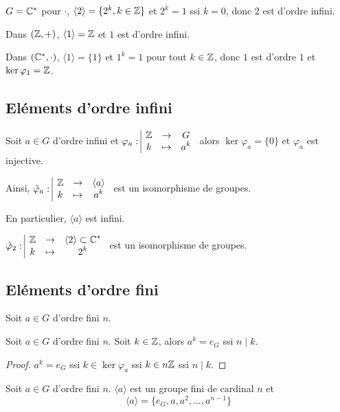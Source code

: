\begin{exemple}
    $G = \mathbb{C}^*$ pour $\cdot$, $\langle 2 \rangle = \{2^k, k \in \mathbb{Z}\}$ et
    $2^k = 1$ ssi $k = 0$, donc $2$ est d'ordre infini.

    Dans $(\mathbb{Z}, +)$, $\langle 1 \rangle = \mathbb{Z}$ et $1$ est d'ordre infini.

    \avspace Dans $(\mathbb{C}^*, \cdot)$, $\langle 1 \rangle = \{1\}$ et
    $1^k = 1$ pour tout $k \in \mathbb{Z}$, donc $1$ est d'ordre $1$ et 
    $\ker \varphi_1 = \mathbb{Z}$.
\end{exemple}


\subsection{Eléments d'ordre infini}

\begin{proposition}{}{}
    Soit $a \in G$ d'ordre infini et $\varphi_a: \space \begin{array}{|ccc} \displaystyle \mathbb{Z} & \to & \displaystyle G \\ \displaystyle k & \mapsto & \displaystyle a^k \end{array}$ 
    alors $\ker \varphi_a = \{0\}$ et $\varphi_a$ est injective.

    Ainsi, $\tilde \varphi_a: \space \begin{array}{|ccc} \displaystyle \mathbb{Z} & \to & \displaystyle \langle a \rangle \\ \displaystyle k & \mapsto & \displaystyle a^k \end{array}$  est un 
    isomorphisme de groupes.

    En particulier, $\langle a \rangle$ est infini.
\end{proposition}

\begin{exemple}
    $\tilde \varphi_2: \space \begin{array}{|ccc} \displaystyle \mathbb{Z} & \to & \displaystyle \langle 2 \rangle \subset \mathbb{C}^* \\ \displaystyle k & \mapsto & \displaystyle 2^k \end{array}$ est un isomorphisme de groupes.

\end{exemple}


\subsection{Eléments d'ordre fini}

Soit $a \in G$ d'ordre fini $n$.

\begin{proposition}{}{}
    Soit $a \in G$ d'ordre fini $n$.
    Soit $k \in \mathbb{Z}$, alors
    $a^k = e_G$ ssi $n \mid k$.
\end{proposition}

\begin{proof}
    $a^k = e_G$ ssi $k \in \ker \varphi_a$ ssi $k \in n \mathbb{Z}$ ssi $n \mid k$.
\end{proof}

\begin{proposition}{}{}
    Soit $a \in G$ d'ordre fini $n$.
    $\langle a \rangle$ est un groupe fini de cardinal $n$ et 
    $$\langle a \rangle = \{e_G, a, a^2, \ldots, a^{n-1}\}$$
\end{proposition}

